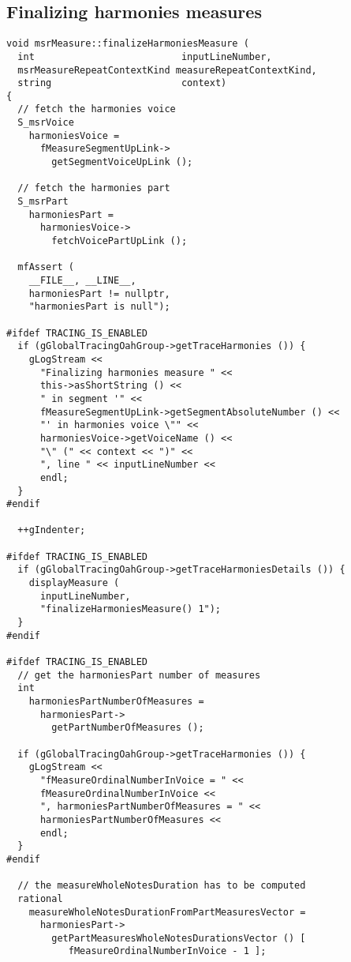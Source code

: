 \subsection{Finalizing harmonies measures}

\begin{lstlisting}[language=CPlusPlus]
void msrMeasure::finalizeHarmoniesMeasure (
  int                          inputLineNumber,
  msrMeasureRepeatContextKind measureRepeatContextKind,
  string                       context)
{
  // fetch the harmonies voice
  S_msrVoice
    harmoniesVoice =
      fMeasureSegmentUpLink->
        getSegmentVoiceUpLink ();

  // fetch the harmonies part
  S_msrPart
    harmoniesPart =
      harmoniesVoice->
        fetchVoicePartUpLink ();

  mfAssert (
    __FILE__, __LINE__,
    harmoniesPart != nullptr,
    "harmoniesPart is null");

#ifdef TRACING_IS_ENABLED
  if (gGlobalTracingOahGroup->getTraceHarmonies ()) {
    gLogStream <<
      "Finalizing harmonies measure " <<
      this->asShortString () <<
      " in segment '" <<
      fMeasureSegmentUpLink->getSegmentAbsoluteNumber () <<
      "' in harmonies voice \"" <<
      harmoniesVoice->getVoiceName () <<
      "\" (" << context << ")" <<
      ", line " << inputLineNumber <<
      endl;
  }
#endif

  ++gIndenter;

#ifdef TRACING_IS_ENABLED
  if (gGlobalTracingOahGroup->getTraceHarmoniesDetails ()) {
    displayMeasure (
      inputLineNumber,
      "finalizeHarmoniesMeasure() 1");
  }
#endif

#ifdef TRACING_IS_ENABLED
  // get the harmoniesPart number of measures
  int
    harmoniesPartNumberOfMeasures =
      harmoniesPart->
        getPartNumberOfMeasures ();

  if (gGlobalTracingOahGroup->getTraceHarmonies ()) {
    gLogStream <<
      "fMeasureOrdinalNumberInVoice = " <<
      fMeasureOrdinalNumberInVoice <<
      ", harmoniesPartNumberOfMeasures = " <<
      harmoniesPartNumberOfMeasures <<
      endl;
  }
#endif

  // the measureWholeNotesDuration has to be computed
  rational
    measureWholeNotesDurationFromPartMeasuresVector =
      harmoniesPart->
        getPartMeasuresWholeNotesDurationsVector () [
           fMeasureOrdinalNumberInVoice - 1 ];


\end{lstlisting}
